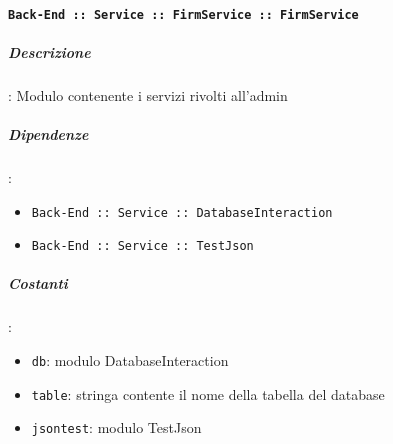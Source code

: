 \documentclass[../DefinizioneDiProdotto_v2.0.0.tex]{subfiles}
\begin{document}
\paragraph{\texttt{Back-End :: Service :: FirmService :: FirmService}}
\subparagraph{Descrizione}: Modulo contenente i servizi rivolti all'admin
\subparagraph{Dipendenze}:
\begin{itemize}
	\item \texttt{Back-End :: Service :: DatabaseInteraction}
	\item \texttt{Back-End :: Service :: TestJson}
\end{itemize}
\subparagraph{Costanti}:
\begin{itemize}
	\item \texttt{db}: modulo DatabaseInteraction
	\item \texttt{table}: stringa contente il nome della tabella del database
	\item \texttt{jsontest}: modulo TestJson
\end{itemize}
\end{document}
